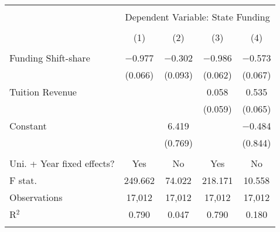 
\begin{tabular}{@{\extracolsep{5pt}}lcccc} 
\\[-1.8ex]\hline 
\hline \\[-1.8ex] 
 & \multicolumn{4}{c}{Dependent Variable: State Funding} \\ 
\cline{2-5} 
\\[-1.8ex] & (1) & (2) & (3) & (4)\\ 
\hline \\[-1.8ex] 
 Funding Shift-share& $-$0.977 & $-$0.302 & $-$0.986 & $-$0.573 \\ 
  & (0.066) & (0.093) & (0.062) & (0.067) \\ 
  Tuition Revenue &  &  & 0.058 & 0.535 \\ 
  &  &  & (0.059) & (0.065) \\ 
  Constant &  & 6.419 &  & $-$0.484 \\ 
  &  & (0.769) &  & (0.844) \\ 
 \hline \\[-1.8ex] 
Uni. + Year fixed effects? & Yes & No & Yes & No \\ 
F stat. & 249.662 & 74.022 & 218.171 & 10.558 \\ 
Observations & 17,012 & 17,012 & 17,012 & 17,012 \\ 
R$^{2}$ & 0.790 & 0.047 & 0.790 & 0.180 \\ 
\hline 
\hline \\[-1.8ex] 
\end{tabular} 
